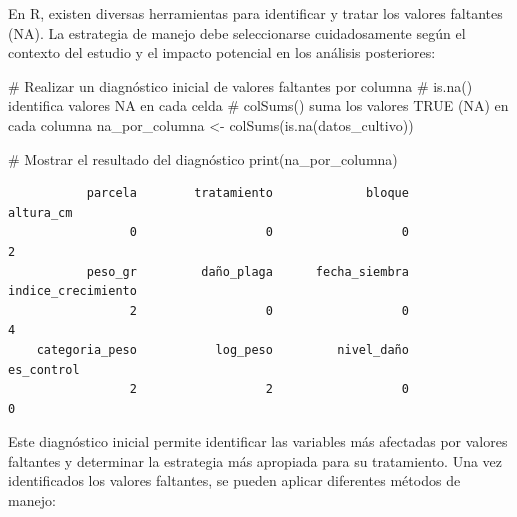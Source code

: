 \documentclass[
  spanish,
  a4paper,
  DIV=11,
  numbers=noendperiod,
  onepage,
  openany]{scrreprt}
\newenvironment{Shaded}{\begin{snugshade}}{\end{snugshade}}
\newcommand{\AttributeTok}[1]{\textcolor[rgb]{0.40,0.45,0.13}{#1}}
\newcommand{\CommentTok}[1]{\textcolor[rgb]{0.37,0.37,0.37}{#1}}
\newcommand{\ConstantTok}[1]{\textcolor[rgb]{0.56,0.35,0.01}{#1}}
\newcommand{\FunctionTok}[1]{\textcolor[rgb]{0.28,0.35,0.67}{#1}}
\newcommand{\NormalTok}[1]{\textcolor[rgb]{0.00,0.23,0.31}{#1}}
\newcommand{\OtherTok}[1]{\textcolor[rgb]{0.00,0.23,0.31}{#1}}
\newcommand{\SpecialCharTok}[1]{\textcolor[rgb]{0.37,0.37,0.37}{#1}}
\begin{document}
En R, existen diversas herramientas para identificar y tratar los
valores faltantes (NA). La estrategia de manejo debe seleccionarse
cuidadosamente según el contexto del estudio y el impacto potencial en
los análisis posteriores:

\begin{Shaded}
\begin{Highlighting}[]
\CommentTok{\# Realizar un diagnóstico inicial de valores faltantes por columna}
\CommentTok{\# is.na() identifica valores NA en cada celda}
\CommentTok{\# colSums() suma los valores TRUE (NA) en cada columna}
\NormalTok{na\_por\_columna }\OtherTok{\textless{}{-}} \FunctionTok{colSums}\NormalTok{(}\FunctionTok{is.na}\NormalTok{(datos\_cultivo))}

\CommentTok{\# Mostrar el resultado del diagnóstico}
\FunctionTok{print}\NormalTok{(na\_por\_columna)}
\end{Highlighting}
\end{Shaded}

\begin{verbatim}
           parcela        tratamiento             bloque          altura_cm 
                 0                  0                  0                  2 
           peso_gr         daño_plaga      fecha_siembra indice_crecimiento 
                 2                  0                  0                  4 
    categoria_peso           log_peso         nivel_daño         es_control 
                 2                  2                  0                  0 
\end{verbatim}

Este diagnóstico inicial permite identificar las variables más afectadas
por valores faltantes y determinar la estrategia más apropiada para su
tratamiento. Una vez identificados los valores faltantes, se pueden
aplicar diferentes métodos de manejo:

\begin{Shaded}
\end{Shaded}
\end{document}
